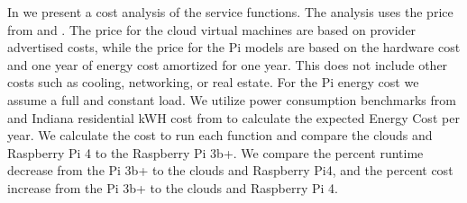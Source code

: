 In  we present a cost analysis of the service
functions. The analysis uses the price from 
and . The price for the cloud virtual machines are based
on provider advertised costs, while the price for the Pi models are
based on the hardware cost and one year of energy cost amortized for
one year. This does not include other costs such as cooling,
networking, or real estate. For the Pi energy cost we assume a full
and constant load. We utilize power consumption benchmarks
from \cite{pi-power} and Indiana residential kWH cost
from \cite{indiana-energy} to calculate the expected Energy Cost per
year. We calculate the cost to run each function and compare the
clouds and Raspberry Pi 4 to the Raspberry Pi 3b+. We compare the
percent runtime decrease from the Pi 3b+ to the clouds and Raspberry
Pi4, and the percent cost increase from the Pi 3b+ to the clouds and
Raspberry Pi 4.

